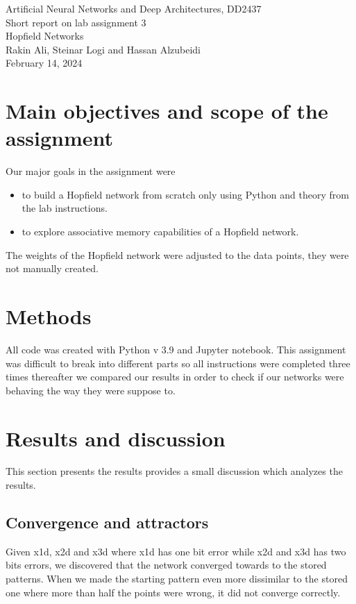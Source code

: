 \documentclass[a4paper]{article}
\begin{document}
\begin{center}
  {\large Artificial Neural Networks and Deep Architectures, DD2437}\\
  \vspace{7mm}
  {\huge Short report on lab assignment 3\\[1ex]}
  {\Large Hopfield Networks}\\
  \vspace{8mm}  
  {\Large Rakin Ali, Steinar Logi and Hassan Alzubeidi\\}
  \vspace{4mm}
  {\large February 14, 2024\\}
\end{center}

\section{Main objectives and scope of the assignment}
Our major goals in the assignment were  
\begin{itemize}
\item to build a Hopfield network from scratch only using Python and theory from the lab instructions.
\item to explore associative memory capabilities of a Hopfield network.
\end{itemize}

The weights of the Hopfield network were adjusted to the data points, they were not manually created.

\section{Methods}
All code was created with Python v 3.9 and Jupyter notebook. This assignment was difficult to break into different parts so all instructions were completed three times thereafter we compared our results in order to check if our networks were behaving the way they were suppose to. 

\section{Results and discussion}
This section presents the results provides a small discussion which analyzes the results.

\subsection{Convergence and attractors}
Given x1d, x2d and x3d where x1d has one bit error while x2d and x3d has two bits errors, we discovered that the network converged towards to the stored patterns. When we made the starting pattern even more dissimilar to the stored one where more than half the points were wrong, it did not converge correctly. 
\end{document}
